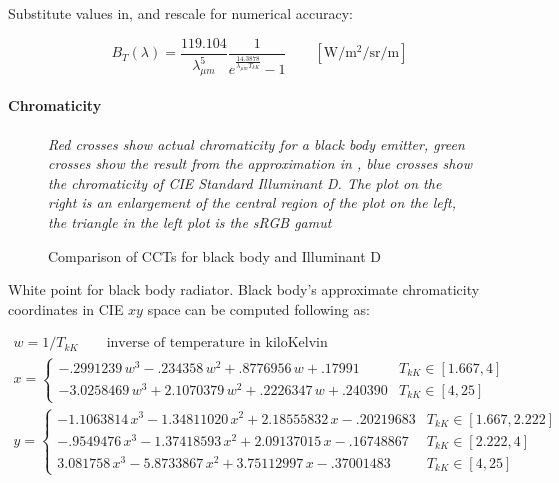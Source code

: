 Substitute values in, and rescale for numerical accuracy:

\begin{equation}
B_T(\lambda) = \frac{119.104}{\lambda_{\mu m}^5} \frac
1{e^{\frac{14.3878}{\lambda_{\mu m} T_{kK}}}-1}
\qquad \left[\unit{\watt\per\square\meter\per\steradian\per\meter}\right]
\end{equation}

\paragraph{Chromaticity}

\begin{figure}
{
\centering
\begin{minipage}{.4\textwidth}

\end{minipage}
\begin{minipage}{.4\textwidth}

\end{minipage}

\caption{Comparison of CCTs for black body and Illuminant D}
\label{fig:blackbodychroma}
}
\vskip 1mm
{\footnotesize\it Red crosses show actual chromaticity for a black body
emitter, green crosses show the result from the approximation in
\cite{kang02}, blue crosses show the chromaticity of CIE Standard
Illuminant D. The plot on the right is an enlargement of the
central region of the plot on the left, the triangle in the left plot
is the sRGB gamut}
\end{figure}

White point for black body radiator. Black body's approximate chromaticity
coordinates in CIE $xy$ space can be computed following \cite{kang02} as:

\begin{equation}
\begin{array}{l}
w = 1/T_{kK} \qquad \text{inverse of temperature in kiloKelvin} \\[1mm]
x = \begin{cases}
     - .2991239\,w^3 -  .234358 \,w^2  +  .8776956\,w  + .17991 & T_{kK} \in [1.667, 4] \\
     -3.0258469\,w^3 + 2.1070379\,w^2  +  .2226347\,w  + .240390 & T_{kK} \in [4, 25]
    \end{cases} \\[1mm]
y = \begin{cases}
     -1.1063814\,x^3 - 1.34811020\,x^2 + 2.18555832\,x - .20219683 & T_{kK} \in [1.667, 2.222] \\
     - .9549476\,x^3 - 1.37418593\,x^2 + 2.09137015\,x - .16748867 & T_{kK} \in [2.222, 4] \\
      3.081758 \,x^3 - 5.8733867 \,x^2 + 3.75112997\,x - .37001483 & T_{kK} \in [4, 25]
    \end{cases} 
\end{array}
\end{equation}

